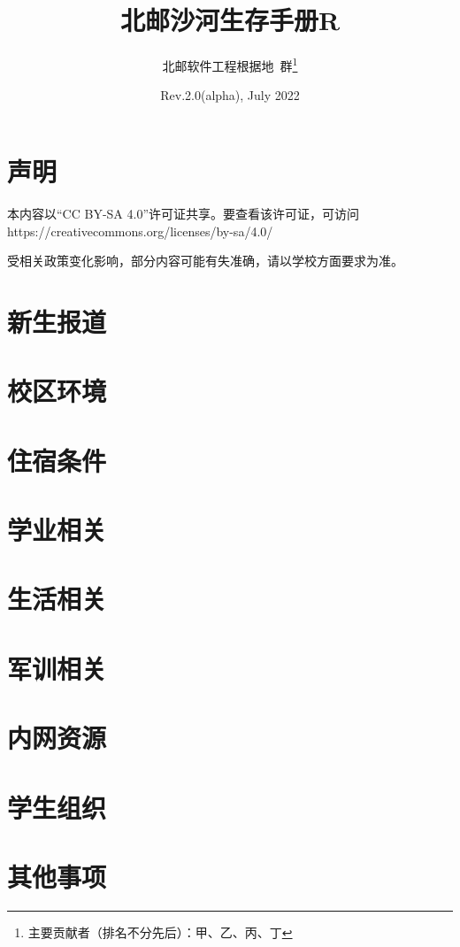 \documentclass[UTF8]{ctexart}
\title{\textbf{北邮沙河生存手册R}}
\author{北邮软件工程根据地\ 群\thanks{主要贡献者（排名不分先后）：甲、乙、丙、丁}}
\date{Rev.2.0(alpha), July 2022}
\begin{document}
\maketitle
\section*{声明}
\begin{center}
本内容以“CC BY-SA 4.0”许可证共享。要查看该许可证，可访问\\
https://creativecommons.org/licenses/by-sa/4.0/

受相关政策变化影响，部分内容可能有失准确，请以学校方面要求为准。
\end{center}
\tableofcontents
\newpage

\section{新生报道}
\section{校区环境}
\section{住宿条件}
\section{学业相关}
\section{生活相关}
\section{军训相关}
\section{内网资源}
\section{学生组织}
\section{其他事项}
\end{document}
